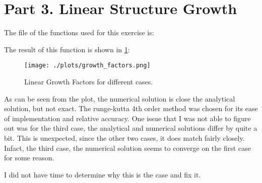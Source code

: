 \section{Part 3. Linear Structure Growth}

The file of the functions used for this exercise is:



The result of this function is shown in \ref{fig:lgf}:

\begin{figure}[h!]
  \centering
  \texttt{[image: ./plots/growth\_factors.png]}
  \caption{Linear Growth Factors for different cases.}
  \label{fig:lgf}
\end{figure}

As can be seen from the plot, the numerical solution is close the analytical solution, but not exact.
The runge-kutta 4th order method was chosen for its ease of implementation and relative accuracy.
One issue that I was not able to figure out was for the third case, the analytical and numerical solutions differ by
quite a bit. This is unexpected, since the other two cases, it does match fairly closely. Infact, the third case, the numerical
solution seems to converge on the first case for some reason.

I did not have time to determine why this is the case and fix it.